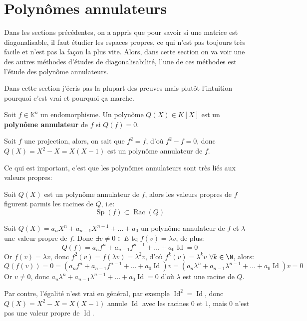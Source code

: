 \section{Polynômes annulateurs}
Dans les sections précédentes, on a appris que pour savoir si une matrice est diagonalisable, il faut étudier les espaces propres, ce qui n'est pas toujours très facile et n'est pas la façon la plus vite. Alors, dans cette section on va voir une des autres méthodes d'études de diagonalisabilité, l'une de ces méthodes est l'étude des polynôme annulateurs.

\begin{remark}
   Dans cette section j'écris pas la plupart des preuves mais plutôt l'intuition pourquoi c'est vrai et pourquoi ça marche. 
\end{remark}

\begin{definition}\label{def:polynome-annulateur}
    Soit $f \in \mathbb{K}^n$ un endomorphisme. Un polynôme $Q(X) \in K[X]$ est un \textbf{polynôme annulateur} de $f$ si  $Q(f) = 0$.
\end{definition}
\begin{eg}
   Soit $f$ une projection, alors, on sait que $f^2 = f$, d'où $f^2 - f = 0$, donc  $Q(X) = X^2 - X = X(X - 1)$ est un polynôme annulateur de  $f$.
\end{eg}

Ce qui est important, c'est que les polynômes annulateurs sont très liés aux valeurs propres:
\begin{prop}
   Soit $Q(X)$ est un polynôme annulateur de  $f$, alors les valeurs propres de  $f$ figurent parmis les racines de  $Q$, i.e:
   \[
       \operatorname{Sp}(f) \subset \operatorname{Rac}(Q)
   \] 
\end{prop}
\begin{preuve}
    Soit $Q(X) = a_n X^n + a_{n-1} X^{n-1} + \ldots + a_0$ un polynôme annulateur de $f$ et  $\lambda$ une valeur propre de  $f$. Donc  $\exists v \neq 0 \in E$ tq $f(v) = \lambda v$, de plus:
    \[
        Q(f) = a_n f^n + a_{n-1} f^{n-1} + \ldots + a_0 \operatorname{Id} = 0
    \] 
    Or $f(v) = \lambda v$, donc  $f^2(v) = f(\lambda v) = \lambda^2 v$, d'où  $f^k(v) = \lambda^k v$  $\forall k \in \N$, alors:
    \[
        Q(f(v)) = 0 = (a_n f^n + a_{n-1} f^{n-1} + \ldots + a_0 \operatorname{Id})v = (a_n \lambda^n + a_{n-1} \lambda^{n-1} + \ldots + a_0 \operatorname{Id})v = 0
     \] 
     Or $v \neq 0$, donc $a_n \lambda^n + a_{n-1} \lambda^{n-1} + \ldots + a_0 \operatorname{Id} = 0$ d'où  $\lambda$ est une racine de  $Q$.
\end{preuve}
\begin{note}
    Par contre, l'égalité n'est vrai en général, par exemple $\operatorname{Id}^2 = \operatorname{Id}$, donc  $Q(X) = X^2 - X = X(X - 1)$ annule $\operatorname{Id}$ avec les racines  $0$ et  $1$, mais  $0$ n'est pas une valeur propre de  $\operatorname{Id}$.
\end{note}

